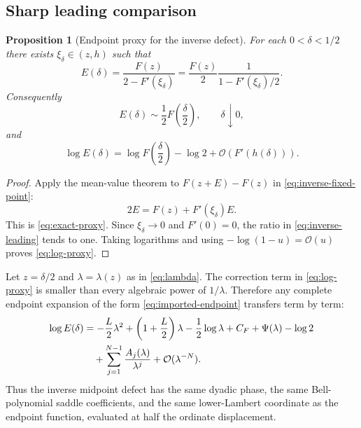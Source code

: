 \documentclass[11pt,oneside]{article}
\newtheorem{proposition}[theorem]{Proposition}
\theoremstyle{definition}
\theoremstyle{remark}
\newcommand{\bigO}{\mathcal O}
\begin{document}
\subsection{Sharp leading comparison}
\begin{proposition}[Endpoint proxy for the inverse defect]
\label{prop:inverse-proxy}
For each $0<\delta<1/2$ there exists $\xi_\delta\in(z,h)$ such that
\begin{equation}
 E(\delta)=\frac{F(z)}{2-F'(\xi_\delta)}
 =\frac{F(z)}2\frac1{1-F'(\xi_\delta)/2}.
 \label{eq:exact-proxy}
\end{equation}
Consequently
\begin{equation}
 E(\delta)\sim\frac12F\!\left(\frac\delta2\right),
 \qquad \delta\downarrow0,
 \label{eq:inverse-leading}
\end{equation}
and
\begin{equation}
 \log E(\delta)
 =\log F\!\left(\frac\delta2\right)-\log2
  +\bigO(F'(h(\delta))).
 \label{eq:log-proxy}
\end{equation}
\end{proposition}

\begin{proof}
Apply the mean-value theorem to $F(z+E)-F(z)$ in \eqref{eq:inverse-fixed-point}:
\[
 2E=F(z)+F'(\xi_\delta)E.
\]
This is \eqref{eq:exact-proxy}.  Since $\xi_\delta\to0$ and $F'(0)=0$, the ratio in \eqref{eq:inverse-leading} tends to one.  Taking logarithms and using $-\log(1-u)=\bigO(u)$ proves \eqref{eq:log-proxy}.
\end{proof}

\begin{corpusdeductionbox}[title=Lambert--W transfer theorem]
Let $z=\delta/2$ and $\lambda=\lambda(z)$ as in \eqref{eq:lambda}.  The correction term in \eqref{eq:log-proxy} is smaller than every algebraic power of $1/\lambda$.  Therefore any complete endpoint expansion of the form \eqref{eq:imported-endpoint} transfers term by term:
\begin{align}
 \log E(\delta)
 &=-\frac L2\lambda^2
  +\left(1+\frac L2\right)\lambda
  -\frac12\log\lambda
  +C_F+\Psi(\lambda)-\log2
 \notag\\
 &\quad+\sum_{j=1}^{N-1}\frac{A_j(\lambda)}{\lambda^j}
  +\bigO(\lambda^{-N}).
 \label{eq:inverse-lambert-transfer}
\end{align}
Thus the inverse midpoint defect has the same dyadic phase, the same Bell-polynomial saddle coefficients, and the same lower-Lambert coordinate as the endpoint function, evaluated at half the ordinate displacement.
\end{corpusdeductionbox}
\end{document}
